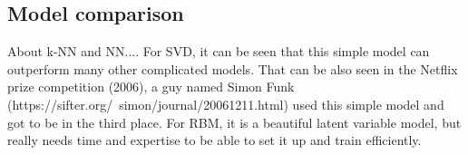 \documentclass[bj, preprint]{imsart}
\begin{document}


\subsection{Model comparison}\label{sebsec:results.model}


About k-NN and NN.... For SVD, it can be seen that this simple model can outperform many other complicated models. That can be also seen in the Netflix prize competition (2006), a guy named Simon Funk (https://sifter.org/~simon/journal/20061211.html) used this simple model and got to be in the third place. For RBM, it is a beautiful latent variable model, but really needs time and expertise to be able to set it up and train efficiently.  




{}
\end{document}
